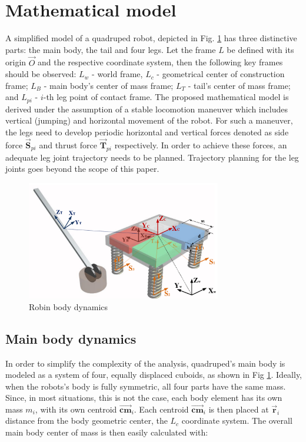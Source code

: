 \section{Mathematical model}\label{sec:MathModel}
A simplified model of a quadruped robot, depicted in Fig. \ref{fig:rmoment} has three distinctive parts: the main body, the tail and four legs. Let the frame $L$ be defined with its origin $\vec{O}$ and the respective coordinate system, then the following key frames should be observed: $L_w$ - world frame, $L_c$ - geometrical center of construction frame; $L_B$ - main body's center of mass frame; $L_T$ - tail's center of mass frame; and $L_{pi}$ - $i$-th leg point of contact frame. The proposed mathematical model is derived under the assumption of a stable locomotion maneuver which includes vertical (jumping) and horizontal movement of the robot. For such a maneuver, the legs need to develop periodic horizontal and vertical forces denoted as side force $\vec{\textbf{S}}_{pi}$ and thrust force $\vec{\textbf{T}}_{pi}$ respectively. In order to achieve these forces, an adequate leg joint trajectory needs to be planned. Trajectory planning for the leg joints goes beyond the scope of this paper. 

\begin{figure}
	\centering
	\includegraphics[width=85mm]{./pictures/RobinMoment.pdf}
	\caption{Robin body dynamics}
	\label{fig:rmoment}
\end{figure}

\subsection{Main body dynamics}
In order to simplify the complexity of the analysis, quadruped's main body is modeled as a system of four, equally displaced cuboids, as shown in Fig \ref{fig:rmoment}. Ideally, when the robots's body is fully symmetric, all four parts have the same mass. Since, in most situations, this is not the case, each body element has its own mass $m_i$, with its own centroid $\vec{\textbf{cm}}_i$. Each centroid $\vec{\textbf{cm}}_i$ is then placed at $\vec{\textbf{r}}_i$ distance from the body geometric center, the $L_c$ coordinate system. The overall main body center of mass is then easily calculated with:
 
